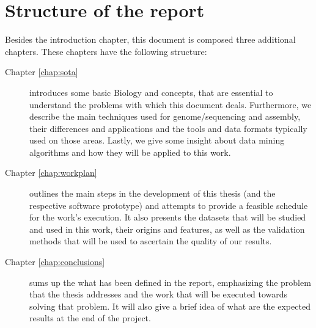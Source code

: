 \section{Structure of the report} \label{sec:outline}

Besides the introduction chapter, this document is composed three additional
chapters. These chapters have the following structure:

\begin{description}

  \item[Chapter \ref{chap:sota}]
  introduces some basic Biology and \rnaseq{} concepts, that are essential to
  understand the problems with which this document deals. Furthermore, we
  describe the main techniques used for genome/\trans sequencing and assembly,
  their differences and applications and the tools and data formats typically
  used on those areas. Lastly, we give some insight about data mining algorithms
  and how they will be applied to this work.

  \item[Chapter \ref{chap:workplan}]
  outlines the main steps in the development of this thesis (and the respective
  software prototype) and attempts to provide a feasible schedule for the work's
  execution. It also presents the datasets that will be studied and used in this
  work, their origins and features, as well as the validation methods that will
  be used to ascertain the quality of our results.

  \item[Chapter \ref{chap:conclusions}]
  sums up the what has been defined in the report, emphasizing the problem that
  the thesis addresses and the work that will be executed towards solving that
  problem. It will also give a brief idea of what are the expected results at
  the end of the project.

\end{description}
